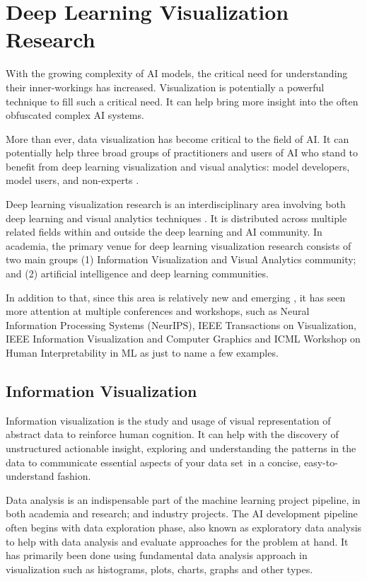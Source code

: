 \section{Deep Learning Visualization Research}

With the growing complexity of AI models, the critical need for understanding their inner-workings has increased. Visualization is potentially a powerful technique to fill such a critical need. It can help bring more insight into the often obfuscated complex AI systems.

More than ever, data visualization has become critical to the field of AI. It can potentially help three broad groups of practitioners and users of AI who stand to benefit from deep learning visualization and visual analytics: model developers, model users, and non-experts \cite{Choo2018}.

Deep learning visualization research is an interdisciplinary area involving both deep learning and visual analytics techniques \cite{Choo2018}. It is distributed across multiple related fields within and outside the deep learning and AI community. In academia, the primary venue for deep learning visualization research consists of two main groups (1) Information Visualization and Visual Analytics community; and (2) artificial intelligence and deep learning communities. 

In addition to that, since this area is relatively new and emerging \cite{Choo2018}, it has seen more attention at multiple conferences and workshops, such as Neural Information Processing Systems (NeurIPS), IEEE Transactions on Visualization, IEEE Information Visualization and Computer Graphics and ICML Workshop on Human Interpretability in ML as just to name a few examples.

\subsection{Information Visualization}

Information visualization is the study and usage of visual representation of abstract data to reinforce human cognition. It can help with the discovery of unstructured actionable insight, exploring and understanding the patterns in the data to communicate essential aspects of your data set in a concise, easy-to-understand fashion.

Data analysis is an indispensable part of the machine learning project pipeline, in both academia and research; and industry projects. The AI development pipeline often begins with data exploration phase, also known as exploratory data analysis to help with data analysis and evaluate approaches for the problem at hand. It has primarily been done using fundamental data analysis approach in visualization such as histograms, plots, charts, graphs and other types.


